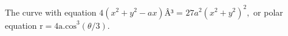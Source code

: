 The curve with equation $4(x^{2}+y^{2}-ax)Â³$ 
= $27a^{2}(x^{2}+y^{2})^{2},$  or polar equation
$ \mathrm{r=4a.cos}^3 ( \theta / 3 ) . $